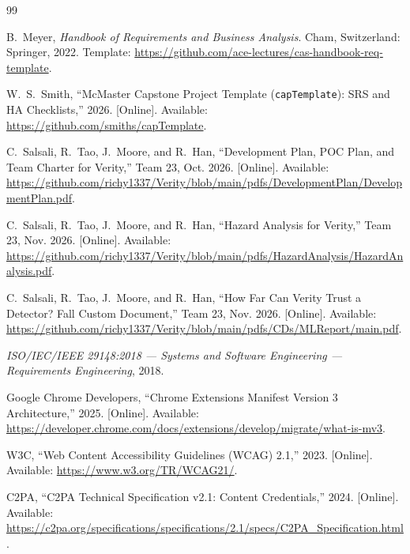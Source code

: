 \documentclass[11pt]{article}
\begin{document}
\newpage

{}
\label{sec:references}

\begin{thebibliography}{99}

B.~Meyer, \emph{Handbook of Requirements and Business Analysis}. Cham, Switzerland: Springer, 2022. Template: \url{https://github.com/ace-lectures/cas-handbook-req-template}.

W.~S.~Smith, ``McMaster Capstone Project Template (\texttt{capTemplate}): SRS and HA Checklists,'' 2026. [Online]. Available: \url{https://github.com/smiths/capTemplate}.

C.~Salsali, R.~Tao, J.~Moore, and R.~Han, ``Development Plan, POC Plan, and Team Charter for Verity,'' Team 23, Oct. 2026. [Online]. Available: \url{https://github.com/richy1337/Verity/blob/main/pdfs/DevelopmentPlan/DevelopmentPlan.pdf}.

C.~Salsali, R.~Tao, J.~Moore, and R.~Han, ``Hazard Analysis for Verity,'' Team 23, Nov. 2026. [Online]. Available: \url{https://github.com/richy1337/Verity/blob/main/pdfs/HazardAnalysis/HazardAnalysis.pdf}.

C.~Salsali, R.~Tao, J.~Moore, and R.~Han, ``How Far Can Verity Trust a Detector? Fall Custom Document,'' Team 23, Nov. 2026. [Online]. Available: \url{https://github.com/richy1337/Verity/blob/main/pdfs/CDs/MLReport/main.pdf}.

\emph{ISO/IEC/IEEE 29148:2018 --- Systems and Software Engineering --- Requirements Engineering}, 2018.

Google Chrome Developers, ``Chrome Extensions Manifest Version 3 Architecture,'' 2025. [Online]. Available: \url{https://developer.chrome.com/docs/extensions/develop/migrate/what-is-mv3}.

W3C, ``Web Content Accessibility Guidelines (WCAG) 2.1,'' 2023. [Online]. Available: \url{https://www.w3.org/TR/WCAG21/}.

C2PA, ``C2PA Technical Specification v2.1: Content Credentials,'' 2024. [Online]. Available: \url{https://c2pa.org/specifications/specifications/2.1/specs/C2PA_Specification.html}.


\end{thebibliography}
\end{document}
